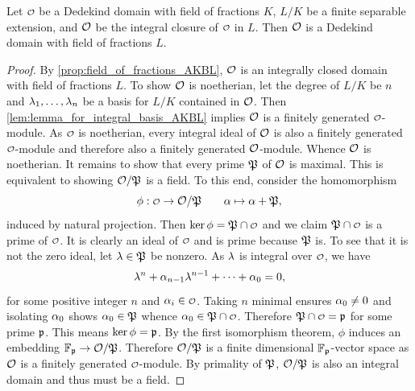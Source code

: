     \begin{proposition}\label{prop:integral_closure_of_Dedekind_is_Dedekind}
      Let \(\smc{O}\) be a Dedekind domain with field of fractions \(K\), \(L/K\) be a finite separable extension, and \(\mathcal{O}\) be the integral closure of \(\smc{O}\) in \(L\). Then \(\mathcal{O}\) is a Dedekind domain with field of fractions \(L\).
    \end{proposition}
    \begin{proof}
      By \cref{prop:field_of_fractions_AKBL}, \(\mathcal{O}\) is an integrally closed domain with field of fractions \(L\). To show \(\mathcal{O}\) is noetherian, let the degree of \(L/K\) be \(n\) and \(\lambda_{1},\ldots,\lambda_{n}\) be a basis for \(L/K\) contained in \(\mathcal{O}\). Then \cref{lem:lemma_for_integral_basis_AKBL} implies \(\mathcal{O}\) is a finitely generated \(\smc{O}\)-module. As \(\smc{O}\) is noetherian, every integral ideal of \(\mathcal{O}\) is also a finitely generated \(\smc{O}\)-module and therefore also a finitely generated \(\mathcal{O}\)-module. Whence \(\mathcal{O}\) is noetherian. It remains to show that every prime \(\mathfrak{P}\) of \(\mathcal{O}\) is maximal. This is equivalent to showing \(\mathcal{O}/\mathfrak{P}\) is a field. To this end, consider the homomorphism
      \[
        \phi:\smc{O} \to \mc{O}/\mf{P} \qquad \a \mapsto \a+\mf{P},
      \]
      induced by natural projection. Then \(\ker\phi = \mf{P} \cap \smc{O}\) and we claim \(\mf{P} \cap \smc{O}\) is a prime of \(\smc{O}\). It is clearly an ideal of \(\smc{O}\) and is prime because \(\mathfrak{P}\) is. To see that it is not the zero ideal, let \(\lambda \in \mathfrak{P}\) be nonzero. As \(\lambda\) is integral over \(\smc{O}\), we have
      \[
        \lambda^{n}+\alpha_{n-1}\lambda^{n-1}+\cdots+\alpha_{0} = 0,
      \]
      for some positive integer \(n\) and \(\a_{i} \in \smc{O}\). Taking \(n\) minimal ensures \(\alpha_{0} \neq 0\) and isolating \(\alpha_{0}\) shows \(\alpha_{0} \in \mathfrak{P}\) whence \(\a_{0} \in \mf{P} \cap \smc{O}\). Therefore \(\mf{P} \cap \smc{O} = \mf{p}\) for some prime \(\mathfrak{p}\). This means \(\ker\phi = \mathfrak{p}\). By the first isomorphism theorem, \(\phi\) induces an embedding \(\mathbb{F}_{\mathfrak{p}} \to \mathcal{O}/\mathfrak{P}\). Therefore \(\mathcal{O}/\mathfrak{P}\) is a finite dimensional \(\mathbb{F}_{\mathfrak{p}}\)-vector space as \(\mathcal{O}\) is a finitely generated \(\smc{O}\)-module. By primality of \(\mathfrak{P}\), \(\mathcal{O}/\mathfrak{P}\) is also an integral domain and thus must be a field.
    \end{proof}

